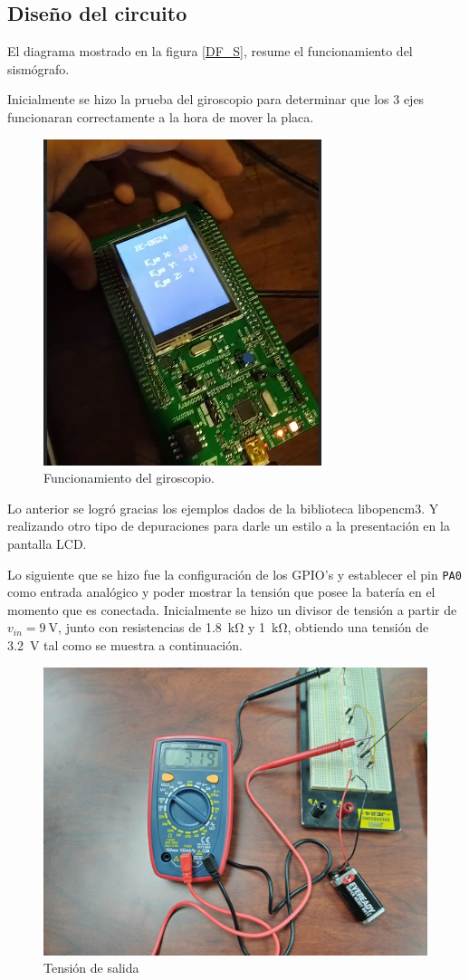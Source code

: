 \subsection*{Diseño del circuito}
El diagrama mostrado en la figura \ref{DF_S}, resume el funcionamiento del sismógrafo.

Inicialmente se hizo la prueba del giroscopio para determinar que los 3 ejes funcionaran correctamente a la hora de mover la placa.
\begin{figure}[H]
\centering
\includegraphics[width=.55\linewidth]{Imagenes/5.png}
 \caption{Funcionamiento del giroscopio.}
 \label{fig_gyro}
\end{figure}
Lo anterior se logró gracias los ejemplos dados de la biblioteca libopencm3. Y realizando otro tipo de depuraciones para darle un estilo a la presentación en la pantalla LCD.\par
Lo siguiente que se hizo fue la configuración de los GPIO's y establecer el pin \texttt{PA0} como entrada analógico y poder mostrar la tensión que posee la batería en el momento que es conectada. Inicialmente se hizo un divisor de tensión a partir de $v_{in}=\SI{9}{\volt}$, junto con resistencias de \SI{1.8}{\kilo\ohm} y \SI{1}{\kilo\ohm}, obtiendo una tensión de \SI{3.2}{\volt} tal como se muestra a continuación.
\begin{figure}[H]
\centering
\includegraphics[width=.55\linewidth]{Imagenes/6.jpeg}
 \caption{Tensión de salida}
 \label{fig_vout}
\end{figure}

